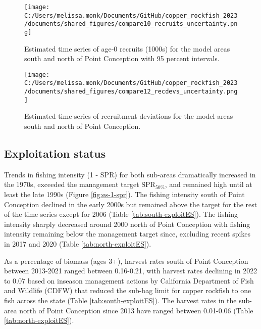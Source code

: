 \documentclass[11pt,
  english,
  letterpaper,
]{article}
\begin{document}


\newpage



\begin{figure}
\centering
\texttt{[image: C:/Users/melissa.monk/Documents/GitHub/copper\_rockfish\_2023/documents/shared\_figures/compare10\_recruits\_uncertainty.png]}
\caption{Estimated time series of age-0 recruits (1000s) for the model areas south and north of Point Conception with 95 percent intervals.\label{fig:es-recruits}}
\end{figure}

\begin{figure}
\centering
\texttt{[image: C:/Users/melissa.monk/Documents/GitHub/copper\_rockfish\_2023/documents/shared\_figures/compare12\_recdevs\_uncertainty.png]}
\caption{Estimated time series of recruitment deviations for the model areas south and north of Point Conception.\label{fig:es-rec-devs}}
\end{figure}

\clearpage

\hypertarget{exploitation-status}{%
\subsection*{Exploitation status}\label{exploitation-status}}

Trends in fishing intensity (1 - SPR) for both sub-areas dramatically increased in the 1970s, exceeded the management target \(\text{SPR}_{50\%}\), and remained high until at least the late 1990s (Figure \ref{fig:es-1-spr}). The fishing intensity south of Point Conception declined in the early 2000s but remained above the target for the rest of the time series except for 2006 (Table \ref{tab:south-exploitES}). The fishing intensity sharply decreased around 2000 north of Point Conception with fishing intensity remaining below the management target since, excluding recent spikes in 2017 and 2020 (Table \ref{tab:north-exploitES}).

As a percentage of biomass (ages 3+), harvest rates south of Point Conception between 2013-2021 ranged between 0.16-0.21, with harvest rates declining in 2022 to 0.07 based on inseason management actions by California Department of Fish and Wildlife (CDFW) that reduced the sub-bag limit for copper rockfish to one fish across the state (Table \ref{tab:south-exploitES}). The harvest rates in the sub-area north of Point Conception since 2013 have ranged between 0.01-0.06 (Table \ref{tab:north-exploitES}).
\end{document}
